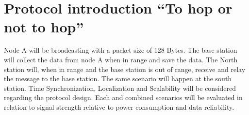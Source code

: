 \section{Protocol introduction “To hop or not to hop”}\label{sc:protocolIntroduction}
Node A will be broadcasting with a packet size of 128 Bytes. The base station will collect the data from node A when in range and save the data. The North station will, when in range and the base station is out of range, receive and relay the message to the base station. The same scenario will happen at the south station. Time Synchronization, Localization and Scalability will be considered regarding the protocol design. Each and combined scenarios will be evaluated in relation to signal strength relative to power consumption and data reliability. 